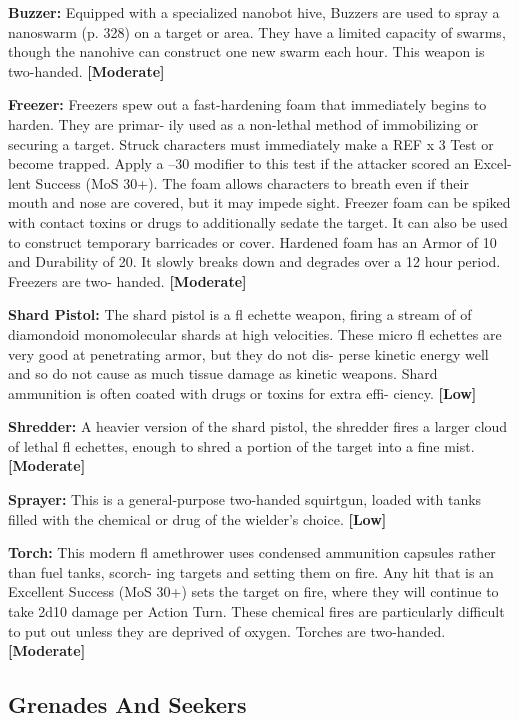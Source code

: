 \textbf{Buzzer:} Equipped with a specialized nanobot hive, 
Buzzers are used to spray a nanoswarm (p. 328) on a 
target or area. They have a limited capacity of swarms, 
though the nanohive can construct one new swarm 
each hour. This weapon is two-handed. \textbf{[Moderate]}

\textbf{Freezer:} Freezers spew out a fast-hardening foam 
that immediately begins to harden. They are primar-
ily used as a non-lethal method of immobilizing or 
securing a target. Struck characters must immediately 
make a REF x 3 Test or become trapped. Apply a –30 
modifier to this test if the attacker scored an Excel-
lent Success (MoS 30+). The foam allows characters 
to breath even if their mouth and nose are covered, 
but it may impede sight. Freezer foam can be spiked 
with contact toxins or drugs to additionally sedate 
the target. It can also be used to construct temporary 
barricades or cover. Hardened foam has an Armor of 
10 and Durability of 20. It slowly breaks down and 
degrades over a 12 hour period. Freezers are two-
handed. \textbf{[Moderate]}

\textbf{Shard Pistol:} The shard pistol is a fl echette weapon, 
firing a stream of of diamondoid monomolecular 
shards at high velocities. These micro fl echettes are 
very good at penetrating armor, but they do not dis-
perse kinetic energy well and so do not cause as much 
tissue damage as kinetic weapons. Shard ammunition 
is often coated with drugs or toxins for extra effi-
ciency. \textbf{[Low]}

\textbf{Shredder:} A heavier version of the shard pistol, 
the shredder fires a larger cloud of lethal fl echettes, 
enough to shred a portion of the target into a fine 
mist. \textbf{[Moderate]}

\textbf{Sprayer:} This is a general-purpose two-handed 
squirtgun, loaded with tanks filled with the chemical 
or drug of the wielder's choice. \textbf{[Low]}

\textbf{Torch:} This modern fl amethrower uses condensed 
ammunition capsules rather than fuel tanks, scorch-
ing targets and setting them on fire. Any hit that is 
an Excellent Success (MoS 30+) sets the target on 
fire, where they will continue to take 2d10 damage 
per Action Turn. These chemical fires are particularly 
difficult to put out unless they are deprived of oxygen. 
Torches are two-handed. \textbf{[Moderate]}

\subsection{Grenades And Seekers}

